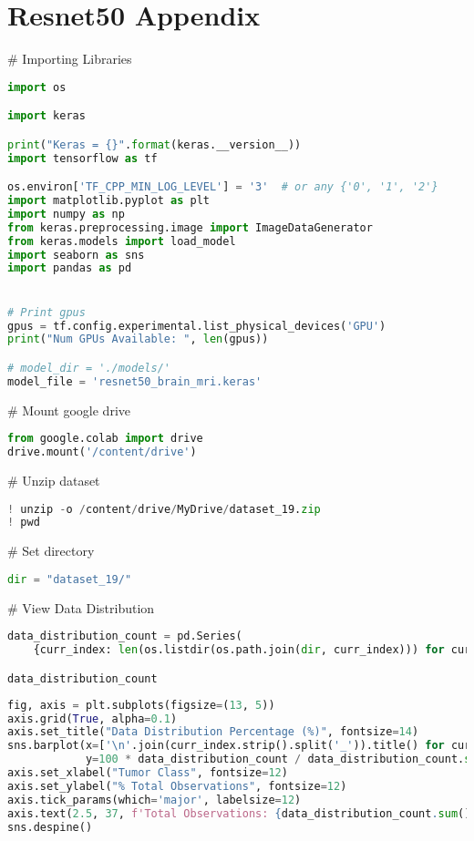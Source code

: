 \section{Resnet50 Appendix}\label{resnet50_appendix}

# Importing Libraries
\begin{lstlisting}[language=Python]
import os

import keras

print("Keras = {}".format(keras.__version__))
import tensorflow as tf

os.environ['TF_CPP_MIN_LOG_LEVEL'] = '3'  # or any {'0', '1', '2'}
import matplotlib.pyplot as plt
import numpy as np
from keras.preprocessing.image import ImageDataGenerator
from keras.models import load_model
import seaborn as sns
import pandas as pd


# Print gpus
gpus = tf.config.experimental.list_physical_devices('GPU')
print("Num GPUs Available: ", len(gpus))

# model_dir = './models/'
model_file = 'resnet50_brain_mri.keras'
\end{lstlisting}

# Mount google drive
\begin{lstlisting}[language=Python]
from google.colab import drive
drive.mount('/content/drive')
\end{lstlisting}

# Unzip dataset
\begin{lstlisting}[language=Python]
! unzip -o /content/drive/MyDrive/dataset_19.zip
! pwd
\end{lstlisting}

# Set directory
\begin{lstlisting}[language=Python]
dir = "dataset_19/"
\end{lstlisting}

# View Data Distribution
\begin{lstlisting}[language=Python]
data_distribution_count = pd.Series(
    {curr_index: len(os.listdir(os.path.join(dir, curr_index))) for curr_index in os.listdir(dir)})

data_distribution_count
\end{lstlisting}

\begin{lstlisting}[language=Python]
fig, axis = plt.subplots(figsize=(13, 5))
axis.grid(True, alpha=0.1)
axis.set_title("Data Distribution Percentage (%)", fontsize=14)
sns.barplot(x=['\n'.join(curr_index.strip().split('_')).title() for curr_index in data_distribution_count.index],
            y=100 * data_distribution_count / data_distribution_count.sum(), ax=axis)
axis.set_xlabel("Tumor Class", fontsize=12)
axis.set_ylabel("% Total Observations", fontsize=12)
axis.tick_params(which='major', labelsize=12)
axis.text(2.5, 37, f'Total Observations: {data_distribution_count.sum()}', fontdict=dict(size=12))
sns.despine()
\end{lstlisting}


